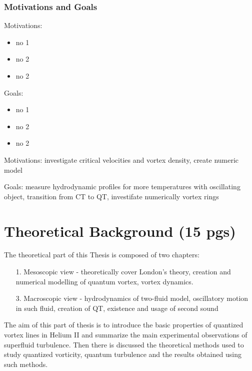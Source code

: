 	\subsection*{Motivations and Goals}

	Motivations:
	\begin{itemize}
		\item no 1
		\item no 2
		\item no 2
	\end{itemize}

	Goals:
	\begin{itemize}
		\item no 1
		\item no 2
		\item no 2
	\end{itemize}

	Motivations: investigate critical velocities and vortex density, create numeric model

	Goals: measure hydrodynamic profiles for more temperatures with oscillating object, transition from CT to QT, investifate numerically vortex rings

\newpage
\chapter{Theoretical Background (15 pgs)}

The theoretical part of this Thesis is composed of two chapters:

\begin{itemize}
	\item[1.] Mesoscopic view - theoretically cover London's theory, creation and numerical modelling of quantum vortex, vortex dynamics.

	\item[3.] Macroscopic view - hydrodynamics of two-fluid model, oscillatory motion in such fluid, creation of QT, existence and usage of second sound

\end{itemize}

The aim of this part of thesis is to introduce the basic properties of quantized vortex lines in Helium II and summarize the main experimental observations of superfluid turbulence. Then there is discussed the theoretical methods used to study quantized vorticity, quantum turbulence and the results obtained using such methods.



\newpage

